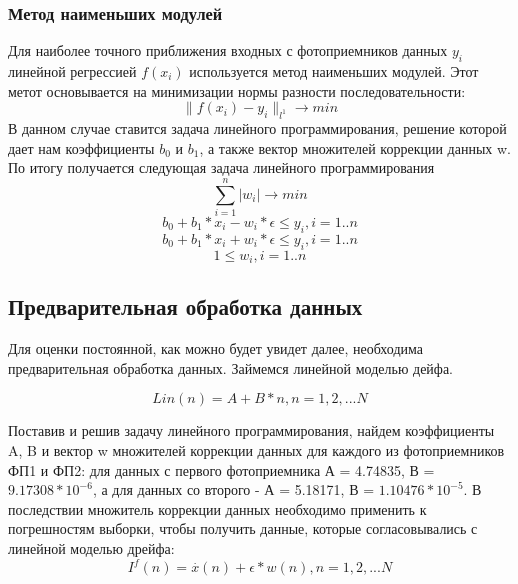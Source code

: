 \documentclass[a4paper,14pt]{article}
\begin{document}
	\subsubsection{Метод наименьших модулей}
	Для наиболее точного приближения входных с фотоприемников данных $y_i$ линейной регрессией $f(x_i)$ используется метод наименьших модулей. Этот метот основывается на минимизации нормы разности последовательности:
	\begin{equation}
		\| f(x_i) - y_i\|_{l^1} \rightarrow min
	\end{equation}
	В данном случае ставится задача линейного программирования, решение которой дает нам коэффициенты $b_0$ и $b_1$, а также вектор множителей коррекции данных w.
	По итогу получается следующая задача линейного программирования
	\begin{equation}
		\sum_{i=1}^n |w_i| \rightarrow min
	\end{equation}
	\begin{equation}
		b_0 + b_1*x_i - w_i * \epsilon \leq y_i, i = 1..n
	\end{equation}
	\begin{equation}
		b_0 + b_1*x_i + w_i * \epsilon \leq y_i, i = 1..n
	\end{equation}
	\begin{equation}
		1 \leq w_i , i = 1..n
	\end{equation}
	
	\subsection{Предварительная обработка данных}
	Для оценки постоянной, как можно будет увидет далее,  необходима предварительная обработка данных. Займемся линейной моделью дейфа.
	
	\begin{equation}
		Lin(n) = A + B * n, n = 1, 2, ... N
	\end{equation}
	
	Поставив и решив задачу линейного программирования, найдем коэффициенты A, B и вектор w множителей коррекции данных для каждого из фотоприемников ФП1 и ФП2: для данных с первого фотоприемника А = 4.74835, В = $9.17308*10^{-6}$, а для данных со второго - А = 5.18171, В = $1.10476*10^{-5}$. В последствии множитель коррекции данных необходимо применить к погрешностям выборки, чтобы получить данные, которые согласовывались с линейной моделью дрейфа:
	\begin{equation}
		I^f(n) = \overset{.}{x}(n) + \epsilon * w(n), n = 1, 2, ... N
	\end{equation}
	
\end{document}
